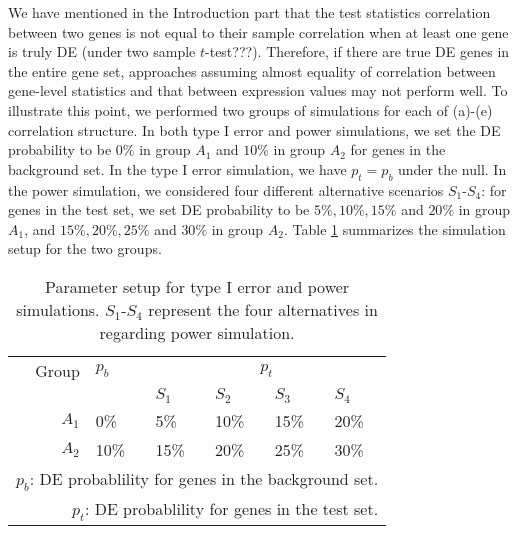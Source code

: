 \documentclass[useAMS,usenatbib, galley]{biom}
\newcommand{\aaCase}{a}
\newcommand{\fCase}{e}
\begin{document}
	 	 We have mentioned in the Introduction part that the test statistics correlation between two genes is not equal to their sample correlation when at least one gene is truly DE (under two sample $t$-test???). Therefore, if there are true DE genes in the entire gene set, approaches assuming almost equality of correlation between gene-level statistics and that between expression values may not perform well. To illustrate this point, we performed two groups of simulations for each of  (\aaCase)-(\fCase) correlation structure.  In both type I error and power simulations, we set the DE probability to be $0\%$ in group $A_1$ and $10\%$ in group $A_2$ for genes in the background set. In the type I error simulation, we have $p_t = p_b$ under the null. In the power simulation, we considered four different alternative scenarios $S_1$-$S_4$: for genes in the test set, we set DE probability to be $5\%, 10\%, 15\%$ and $20\%$ in group $A_1$, and $15\%, 20\%, 25\%$ and $30\%$ in group $A_2$. Table \ref{table:simusetup} summarizes the simulation setup for the two groups.
	 	 
	 	 
	 	 
	 	 
	 	 \begin{table}[!ht]
	 	 	\centering
	 	 		\caption{Parameter setup for type I error and power simulations. $S_1$-$S_4$ represent the four alternatives in regarding power simulation.}
	 	 	\begin{tabular}{rp{1cm}p{1cm}p{1cm}p{1cm}p{1cm}}
	 	 		\hline\hline
	 	 		Group & $p_b$ &  \multicolumn{4}{c}{$p_t$}  \\ 
	 	 		\cline{3-6}
	 	 		  &   & $S_1$ & $S_2$ & $S_3$ & $S_4$\\ 
	 	 	\hline
	 	 		$A_1$ & 0\%   & 5\% & 10\% & 15\% & 20\%\\ 
	 	 		$A_2$ & 10\%  & 15\%& 20\%& 25\% & 30\%\\ 
	 	 		\hline\hline
	 	 			\multicolumn{6}{p{8cm}}{$p_b$: DE probablility for genes in the background set. }	 \\	
	 	 			\multicolumn{6}{p{8cm}}{$p_t$: DE probablility for genes in the test set. }	 \\	
	 	 	\end{tabular}
	 	 	\label{table:simusetup}
	 	 \end{table}
	 	 
\end{document}

